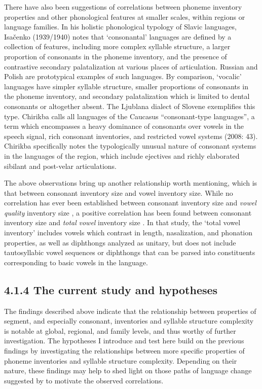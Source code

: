   There have also been suggestions of correlations between phoneme inventory properties and other phonological features at smaller scales, within regions or language families. In his holistic phonological typology of Slavic languages, Isačenko (1939/1940) notes that ‘consonantal’ languages are defined by a collection of features, including more complex syllable structure, a larger proportion of consonants in the phoneme inventory, and the presence of contrastive secondary palatalization at various places of articulation. Russian and Polish are prototypical examples of such languages. By comparison, ‘vocalic’ languages have simpler syllable structure, smaller proportions of consonants in the phoneme inventory, and secondary palatalization which is limited to dental consonants or altogether absent. The Ljublana dialect of Slovene exemplifies this type. Chirikba calls all languages of the Caucasus “consonant-type languages”, a term which encompasses a heavy dominance of consonants over vowels in the speech signal, rich consonant inventories, and restricted vowel systems (2008: 43). Chirikba specifically notes the typologically unusual nature of consonant systems in the languages of the region, which include ejectives and richly elaborated sibilant and post-velar articulations.

  The above observations bring up another relationship worth mentioning, which is that between consonant inventory size and vowel inventory size. While no correlation has ever been established between consonant inventory size and \textit{vowel} \textit{quality} inventory size \citep{Maddieson2013c}, a positive correlation has been found between consonant inventory size and \textit{total} \textit{vowel} inventory size \citep{Maddieson2011}. In that study, the ‘total vowel inventory’ includes vowels which contrast in length, nasalization, and phonation properties, as well as diphthongs analyzed as unitary, but does not include tautosyllabic vowel sequences or diphthongs that can be parsed into constituents corresponding to basic vowels in the language.

\subsection{4.1.4 The current study and hypotheses}

  The findings described above indicate that the relationship between properties of segment, and especially consonant, inventories and syllable structure complexity is notable at global, regional, and family levels, and thus worthy of further investigation. The hypotheses I introduce and test here build on the previous findings by investigating the relationships between more specific properties of phoneme inventories and syllable structure complexity. Depending on their nature, these findings may help to shed light on those paths of language change suggested by \citet{Maddieson2006} to motivate the observed correlations.

